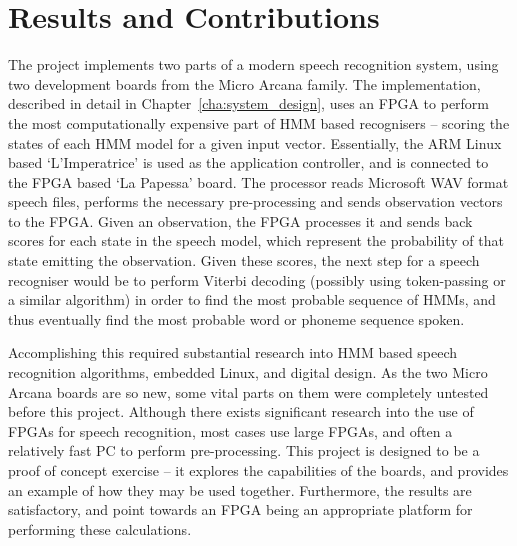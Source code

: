 \section{Results and Contributions} %
\label{sec:contributions}
	The project implements two parts of a modern speech recognition system, using two development boards from the Micro Arcana family.  The implementation, described in detail in Chapter~\ref{cha:system_design}, uses an FPGA to perform the most computationally expensive part of HMM based recognisers -- scoring the states of each HMM model for a given input vector.  Essentially, the ARM Linux based `L'Imperatrice' is used as the application controller, and is connected to the FPGA based `La Papessa' board.  The processor reads Microsoft WAV format speech files, performs the necessary pre-processing and sends observation vectors to the FPGA.  Given an observation, the FPGA processes it and sends back scores for each state in the speech model, which represent the probability of that state emitting the observation.  Given these scores, the next step for a speech recogniser would be to perform Viterbi decoding (possibly using token-passing or a similar algorithm) in order to find the most probable sequence of HMMs, and thus eventually find the most probable word or phoneme sequence spoken.

	Accomplishing this required substantial research into HMM based speech recognition algorithms, embedded Linux, and digital design.  As the two Micro Arcana boards are so new, some vital parts on them were completely untested before this project.  Although there exists significant research into the use of FPGAs for speech recognition, most cases use large FPGAs, and often a relatively fast PC to perform pre-processing.  This project is designed to be a proof of concept exercise -- it explores the capabilities of the boards, and provides an example of how they may be used together.  Furthermore, the results are satisfactory, and point towards an FPGA being an appropriate platform for performing these calculations.



